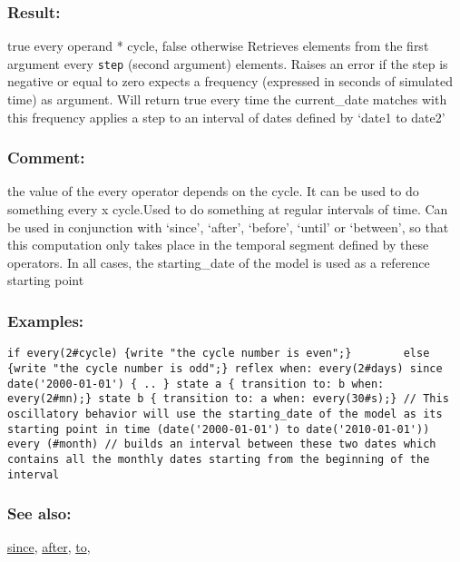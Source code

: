 \documentclass[]{book}
\theoremstyle{definition}
\theoremstyle{definition}
\theoremstyle{definition}
\theoremstyle{remark}
\begin{document}
\subsubsection{Result:}\label{result-152}

true every operand * cycle, false otherwise Retrieves elements from the
first argument every \texttt{step} (second argument) elements. Raises an
error if the step is negative or equal to zero expects a frequency
(expressed in seconds of simulated time) as argument. Will return true
every time the current\_date matches with this frequency applies a step
to an interval of dates defined by `date1 to date2'

\subsubsection{Comment:}\label{comment-34}

the value of the every operator depends on the cycle. It can be used to
do something every x cycle.Used to do something at regular intervals of
time. Can be used in conjunction with `since', `after', `before',
`until' or `between', so that this computation only takes place in the
temporal segment defined by these operators. In all cases, the
starting\_date of the model is used as a reference starting point

\subsubsection{Examples:}\label{examples-117}

\begin{verbatim}
if every(2#cycle) {write "the cycle number is even";}        else {write "the cycle number is odd";} reflex when: every(2#days) since date('2000-01-01') { .. } state a { transition to: b when: every(2#mn);} state b { transition to: a when: every(30#s);} // This oscillatory behavior will use the starting_date of the model as its starting point in time (date('2000-01-01') to date('2010-01-01')) every (#month) // builds an interval between these two dates which contains all the monthly dates starting from the beginning of the interval 
\end{verbatim}

\subsubsection{See also:}\label{see-also-88}

\href{OperatorsSZ\#since}{since}, \href{OperatorsAA\#after}{after},
\href{OperatorsSZ\#to}{to},
\end{document}
